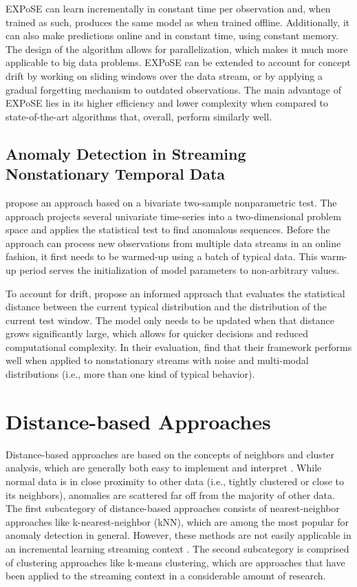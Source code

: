 EXPoSE can learn incrementally in constant time per observation and, when trained as such, produces the same model as when trained offline. Additionally, it can also make predictions online and in constant time, using constant memory. The design of the algorithm allows for parallelization, which makes it much more applicable to big data problems. EXPoSE can be extended to account for concept drift by working on sliding windows over the data stream, or by applying a gradual forgetting mechanism to outdated observations. The main advantage of EXPoSE lies in its higher efficiency and lower complexity when compared to state-of-the-art algorithms that, overall, perform similarly well.


\subsection{Anomaly Detection in Streaming Nonstationary Temporal Data \citep{talagala_anomaly_2019}}
\citet{talagala_anomaly_2019} propose an approach based on a bivariate two-sample nonparametric test. The approach projects several univariate time-series into a two-dimensional problem space and applies the statistical test to find anomalous sequences. Before the approach can process new observations from multiple data streams in an online fashion, it first needs to be warmed-up using a batch of typical data. This warm-up period serves the initialization of model parameters to non-arbitrary values.

To account for drift, \citet{talagala_anomaly_2019} propose an informed approach that evaluates the statistical distance between the current typical distribution and the distribution of the current test window. The model only needs to be updated when that distance grows significantly large, which allows for quicker decisions and reduced computational complexity. In their evaluation, \citet{talagala_anomaly_2019} find that their framework performs well when applied to nonstationary streams with noise and multi-modal distributions (i.e., more than one kind of typical behavior).


\section{Distance-based Approaches}
Distance-based approaches are based on the concepts of neighbors and cluster analysis, which are generally both easy to implement and interpret \citep{schneider_expected_2016}. While normal data is in close proximity to other data (i.e., tightly clustered or close to its neighbors), anomalies are scattered far off from the majority of other data. The first subcategory of distance-based approaches consists of nearest-neighbor approaches like k-nearest-neighbor (kNN), which are among the most popular for anomaly detection in general. However, these methods are not easily applicable in an incremental learning streaming context \citep{pimentel_review_2014}. The second subcategory is comprised of clustering approaches like k-means clustering, which are approaches that have been applied to the streaming context in a considerable amount of research.

